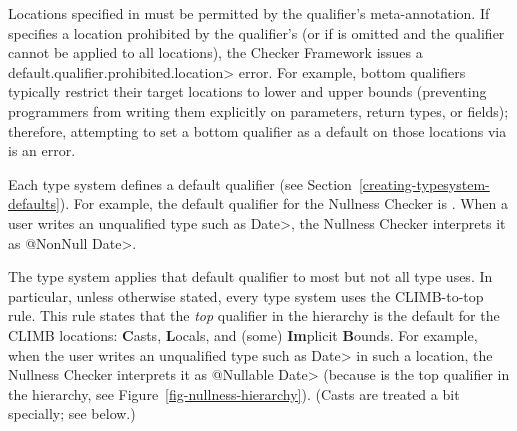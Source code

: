 Locations specified in  must be
permitted by the qualifier's 
meta-annotation.  If  specifies a location prohibited
by the qualifier's  (or if  is omitted
and the qualifier cannot be applied to all locations), the Checker Framework
issues a \<default.qualifier.prohibited.location> error.  For example, bottom qualifiers typically
restrict their target locations to lower and upper bounds (preventing
programmers from writing them explicitly on parameters, return types, or
fields); therefore, attempting to set a bottom qualifier as a default on
those locations via  is an error.







Each type system defines a default qualifier (see
Section~\ref{creating-typesystem-defaults}).  For example, the default
qualifier for the Nullness Checker is
.  When a user
writes an unqualified type such as \<Date>, the Nullness Checker interprets it as
\<@NonNull Date>.

The type system applies that default qualifier to most but
not all type uses.  In particular, unless otherwise stated, every type system
uses the CLIMB-to-top rule.  This
rule states that the \emph{top} qualifier in the hierarchy is the default for
the CLIMB locations:  \textbf{C}asts, \textbf{L}ocals,
and (some) \textbf{Im}plicit \textbf{B}ounds.
For example, when the user writes an unqualified type such as \<Date> in such a
location, the Nullness Checker interprets it as \<@Nullable Date> (because
 is the top qualifier in the
hierarchy, see Figure~\ref{fig-nullness-hierarchy}).
(Casts are treated a bit specially; see below.)


